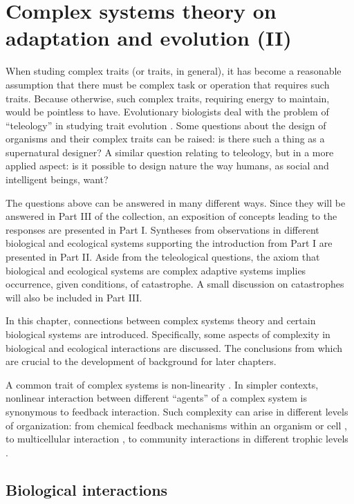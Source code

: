 \chapter{Complex systems theory on adaptation and evolution (II)}

When studing complex traits (or traits, in general), it has become a reasonable assumption that there must be complex task or operation that requires such traits.
Because otherwise, such complex traits, requiring energy to maintain, would be pointless to have.
Evolutionary biologists deal with the problem of ``teleology'' in studying trait evolution \cite{Veloso2019}.
Some questions about the design of organisms and their complex traits can be raised: is there such a thing as a supernatural designer?
A similar question relating to teleology, but in a more applied aspect: is it possible to design nature the way humans, as social and intelligent beings, want?

The questions above can be answered in many different ways.
Since they will be answered in Part III of the collection, an exposition of concepts leading to the responses are presented in Part I.
Syntheses from observations in different biological and ecological systems supporting the introduction from Part I are presented in Part II.
Aside from the teleological questions, the axiom that biological and ecological systems are complex adaptive systems \cite{Dong2019} implies occurrence, given conditions, of catastrophe.
A small discussion on catastrophes will also be included in Part III.

In this chapter, connections between complex systems theory and certain biological systems are introduced.
Specifically, some aspects of complexity in biological and ecological interactions are discussed.
The conclusions from which are crucial to the development of background for later chapters.

A common trait of complex systems is non-linearity \cite{Devaney}.
In simpler contexts, nonlinear interaction between different ``agents'' of a complex system is synonymous to feedback interaction.
Such complexity can arise in different levels of organization: from chemical feedback mechanisms within an organism or cell \cite{Chaves2019}, to multicellular interaction \cite{Veloso2017}, to community interactions in different trophic levels \cite{Seibold2018}.

\section{Biological interactions}
